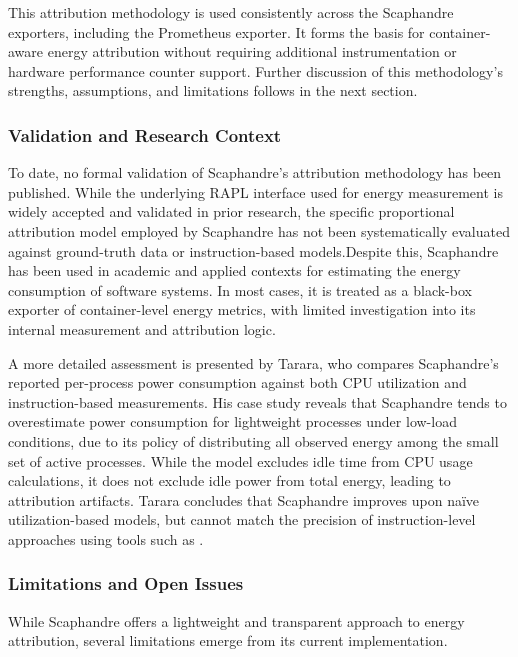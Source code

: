 This attribution methodology is used consistently across the Scaphandre exporters, including the Prometheus exporter. It forms the basis for container-aware energy attribution without requiring additional instrumentation or hardware performance counter support. Further discussion of this methodology’s strengths, assumptions, and limitations follows in the next section.

\subsubsection{Validation and Research Context}
\label{sec:scaphandre-validation}

To date, no formal validation of Scaphandre’s attribution methodology has been published. While the underlying RAPL interface used for energy measurement is widely accepted and validated in prior research, the specific proportional attribution model employed by Scaphandre has not been systematically evaluated against ground-truth data or instruction-based models.Despite this, Scaphandre has been used in academic and applied contexts for estimating the energy consumption of software systems. In most cases, it is treated as a black-box exporter of container-level energy metrics, with limited investigation into its internal measurement and attribution logic.

A more detailed assessment is presented by Tarara\parencite{Tarara2023CpuUtilization}, who compares Scaphandre’s reported per-process power consumption against both CPU utilization and instruction-based measurements. His case study reveals that Scaphandre tends to overestimate power consumption for lightweight processes under low-load conditions, due to its policy of distributing all observed energy among the small set of active processes. While the model excludes idle time from CPU usage calculations, it does not exclude idle power from total energy, leading to attribution artifacts. Tarara concludes that Scaphandre improves upon naïve utilization-based models, but cannot match the precision of instruction-level approaches using tools such as .

\subsubsection{Limitations and Open Issues}
\label{sec:scaphandre-limitations}

While Scaphandre offers a lightweight and transparent approach to energy attribution, several limitations emerge from its current implementation.


